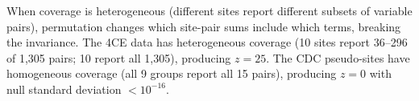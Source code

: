 \documentclass{article}
\begin{document}
When coverage is heterogeneous (different sites report different subsets of variable pairs), permutation changes which site-pair sums include which terms, breaking the invariance.  The 4CE data has heterogeneous coverage (10 sites report 36--296 of 1,305 pairs; 10 report all 1,305), producing $z = 25$.  The CDC pseudo-sites have homogeneous coverage (all 9 groups report all 15 pairs), producing $z = 0$ with null standard deviation $< 10^{-16}$.



\end{document}
